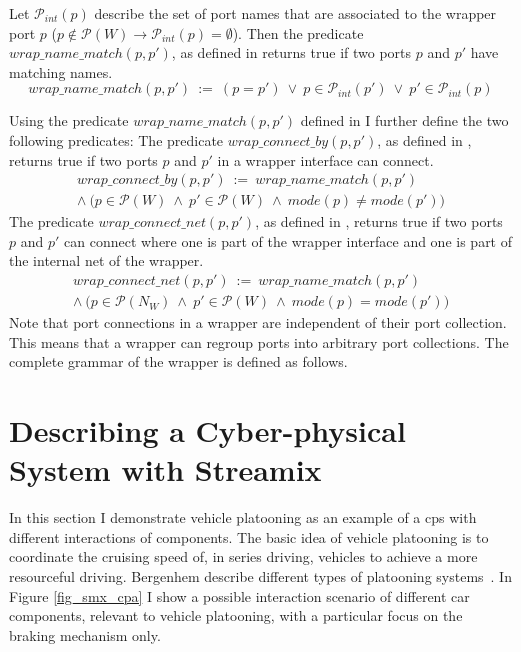 Let $\mathcal{P}_{int}(p)$ describe the set of port names that are associated to the wrapper port $p$ ($p \notin \mathcal{P}(W) \rightarrow \mathcal{P}_{int}(p) = \emptyset$).
Then the predicate $wrap\_name\_match(p, p')$, as defined in \Equ{\ref{eq_smx_wrap_port_name}} returns true if two ports $p$ and $p'$ have matching names.
\begin{equation}
    wrap\_name\_match(p, p') \ := \ ( p = p' ) \ \lor \ p \in \mathcal{P}_{int}(p') \ \lor \ p' \in \mathcal{P}_{int}(p)
    \label{eq_smx_wrap_port_name}
\end{equation}

Using the predicate $wrap\_name\_match(p, p')$ defined in \Equ{\ref{eq_smx_wrap_port_name}} I further define the two following predicates:
The predicate $wrap\_connect\_by(p, p')$, as defined in \Equ{\ref{eq_smx_wrap_con_by}}, returns true if two ports $p$ and $p'$ in a wrapper interface can connect.
\begin{multline}
    wrap\_connect\_by(p, p') \ := \ wrap\_name\_match(p, p') \\
    \land \ \big ( p \in \mathcal{P}(W) \ \land \ p' \in \mathcal{P}(W) \ \land \ mode(p) \neq mode(p') \big )
    \label{eq_smx_wrap_con_by}
\end{multline}
The predicate $wrap\_connect\_net(p, p')$, as defined in \Equ{\ref{eq_smx_wrap_con_net}}, returns true if two ports $p$ and $p'$ can connect where one is part of the wrapper interface and one is part of the internal net of the wrapper.
\begin{multline}
    wrap\_connect\_net(p, p') \ := \ wrap\_name\_match(p, p') \\
    \land \ \big ( p \in \mathcal{P}(N_W) \ \land \ p' \in \mathcal{P}(W) \ \land \ mode(p) = mode(p') \big )
    \label{eq_smx_wrap_con_net}
\end{multline}
Note that port connections in a wrapper are independent of their port collection.
This means that a wrapper can regroup ports into arbitrary port collections.
The complete grammar of the wrapper is defined as follows.


\section{Describing a Cyber-physical System with Streamix}
\label{sect_smx_example}
In this section I demonstrate vehicle platooning as an example of a \gls{cps} with different interactions of components.
The basic idea of vehicle platooning is to coordinate the cruising speed of, in series driving, vehicles to achieve a more resourceful driving.
Bergenhem \etal describe different types of platooning systems~\cite{bergenhem2012}.
In Figure \ref{fig_smx_cpa} I show a possible interaction scenario of different car components, relevant to vehicle platooning, with a particular focus on the braking mechanism only.

